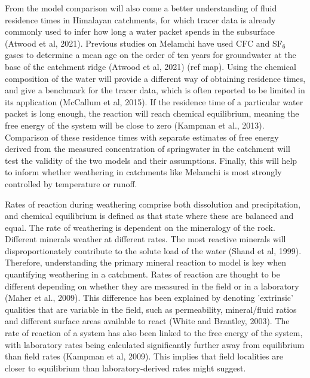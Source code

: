 \bsk

From the model comparison will also come a better understanding of fluid residence times in Himalayan catchments, for which tracer data is already commonly used to infer how long a water packet spends in the subsurface (Atwood et al, 2021). Previous studies on Melamchi have used CFC and SF$_6$ gases to determine a mean age on the order of ten years for groundwater at the base of the catchment ridge (Atwood et al, 2021) (ref map). Using the chemical composition of the water will provide a different way of obtaining residence times, and give a benchmark for the tracer data, which is often reported to be limited in its application (McCallum et al, 2015). If the residence time of a particular water packet is long enough, the reaction will reach chemical equilibrium, meaning the free energy of the system will be close to zero (Kampman et al., 2013). Comparison of these residence times with separate estimates of free energy derived from the measured concentration of springwater in the catchment will test the validity of the two models and their assumptions. Finally, this will help to inform whether weathering in catchments like Melamchi is most strongly controlled by temperature or runoff.

\bsk

Rates of reaction during weathering comprise both dissolution and precipitation, and chemical equilibrium is defined as that state where these are balanced and equal. The rate of weathering is dependent on the mineralogy of the rock. Different minerals weather at different rates. The most reactive minerals will disproportionately contribute to the solute load of the water (Shand et al, 1999). Therefore, understanding the primary mineral reaction to model is key when quantifying weathering in a catchment. Rates of reaction are thought to be different depending on whether they are measured in the field or in a laboratory (Maher et al., 2009). This difference has been explained by denoting 'extrinsic' qualities that are variable in the field, such as permeability, mineral/fluid ratios and different surface areas available to react (White and Brantley, 2003). The rate of reaction of a system has also been linked to the free energy of the system, with laboratory rates being calculated significantly further away from equilibrium than field rates (Kampman et al, 2009). This implies that field localities are closer to equilibrium than laboratory-derived rates might suggest. 

\bsk

